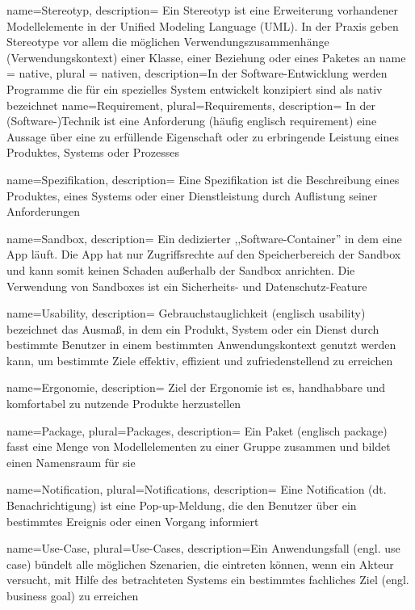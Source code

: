 {
  name=Stereotyp,
  description={
    Ein Stereotyp ist eine Erweiterung vorhandener Modellelemente in der Unified Modeling Language (UML). In der Praxis geben Stereotype vor allem die möglichen Verwendungszusammenhänge (Verwendungskontext) einer Klasse, einer Beziehung oder eines Paketes an}
}
{
name = native,
plural = nativen,
description={In der Software-Entwicklung werden Programme die für ein spezielles System entwickelt konzipiert sind als nativ bezeichnet}
}
 {
name=Requirement,
plural=Requirements,
description={
In der (Software-)Technik ist eine Anforderung (häufig englisch requirement) eine Aussage über eine zu erfüllende Eigenschaft oder zu erbringende Leistung eines Produktes, Systems oder Prozesses}
}

{
  name=Spezifikation,
  description={
    Eine Spezifikation ist die Beschreibung eines Produktes, eines Systems oder einer Dienstleistung durch Auflistung seiner Anforderungen}
}

{
  name=Sandbox,
  description={
    Ein dedizierter ,,Software-Container'' in dem eine App läuft. Die App hat nur Zugriffsrechte auf den Speicherbereich der Sandbox und kann somit keinen Schaden außerhalb der Sandbox anrichten. Die Verwendung von Sandboxes ist ein Sicherheits- und Datenschutz-Feature}
}

{
name=Usability,
description={
  Gebrauchstauglichkeit (englisch usability) bezeichnet das Ausmaß, in dem ein Produkt, System oder ein Dienst durch bestimmte Benutzer in einem bestimmten Anwendungskontext genutzt werden kann, um bestimmte Ziele effektiv, effizient und zufriedenstellend zu erreichen}
}

 {
name=Ergonomie,
description={
  Ziel der Ergonomie ist es, handhabbare und komfortabel zu nutzende Produkte herzustellen}
}

 {
name=Package,
plural=Packages,
description={
Ein Paket (englisch package) fasst eine Menge von Modellelementen zu einer Gruppe zusammen und bildet einen Namensraum für sie}
}

 {
name=Notification,
plural=Notifications,
description={
Eine Notification (dt. Benachrichtigung) ist eine Pop-up-Meldung, die den Benutzer über ein bestimmtes Ereignis oder einen Vorgang informiert}
}

 {
name=Use-Case,
plural=Use-Cases,
description={Ein Anwendungsfall (engl. use case) bündelt alle möglichen Szenarien, die eintreten können, wenn ein Akteur versucht,
mit Hilfe des betrachteten Systems ein bestimmtes fachliches Ziel (engl. business goal) zu erreichen}
}
